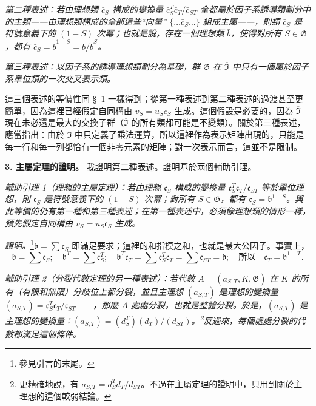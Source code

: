 \documentclass[11pt]{article}
\begin{document}
\emph{第二種表述：若由理想類 \(\bar c_S\) 構成的變換量 \(\bar c_S^T\bar c_T/\bar c_{ST}\) 全都屬於因子系誘導類劃分中的主類——由理想類構成的全部這些“向量” \(\{\ldots\bar c_S\ldots\}\) 組成主屬——，則類 \(\bar c_S\) 是符號意義下的 \((1-S)\) 次冪；也就是說，存在一個理想類 \(\bar b\)，使得對所有 \(S\in\mathfrak G\)，都有 \(\bar c_S=\bar b^{1-S}=\bar b/\bar b^S\)。}

\emph{第三種表述：以因子系的誘導理想類劃分為基礎，群 \(\mathfrak G\) 在 \(\overline{\mathfrak I}\) 中只有一個屬於因子系單位類的一次交叉表示類。}

這三個表述的等價性同 §~1 一樣得到；從第一種表述到第二種表述的過渡甚至更簡單，因為這裡已經假定自同構由 \(v_S=u_S\bar c_S\) 生成。這個假設是必要的，因為 \(\overline{\mathfrak I}\) 現在未必還是最大的交換子群（\(\overline{\mathfrak I}\) 的所有類都可能是不變類）。關於第三種表述，應當指出：由於 \(\overline{\mathfrak I}\) 中只定義了乘法運算，所以這裡作為表示矩陣出現的，只能是每一行和每一列都恰有一個非零元素的矩陣；對一次表示而言，這並不是限制。

\noindent\textbf{3. 主屬定理的證明。} 我證明第二種表述。證明基於兩個輔助引理。

\emph{輔助引理 1（理想的主屬定理）：若由理想 \(\mathfrak c_S\) 構成的變換量 \(\mathfrak c_S^T\mathfrak c_T/\mathfrak c_{ST}\) 等於單位理想，則 \(\mathfrak c_S\) 是符號意義下的 \((1-S)\) 次冪；對所有 \(S\in\mathfrak G\)，都有 \(\mathfrak c_S=\mathfrak b^{1-S}\)。與此等價的仍有第一種和第三種表述；在第一種表述中，必須像理想類的情形一樣，預先假定自同構由 \(v_S=u_S\mathfrak c_S\) 生成。}

\emph{證明。}\footnote{參見引言的末尾。}\(\mathfrak b=\sum\mathfrak c_S\) 即滿足要求；這裡的和指模之和，也就是最大公因子。事實上，
\[
\mathfrak b=\sum\mathfrak c_S;\quad
\mathfrak b^T=\sum\mathfrak c_S^T;\quad
\mathfrak b^T\mathfrak c_T=\sum\mathfrak c_S^T\mathfrak c_T
=\sum\mathfrak c_{ST}=\mathfrak b;\quad
\text{所以}\quad\mathfrak c_T=\mathfrak b^{1-T}.
\]

\emph{輔助引理 2（分裂代數定理的另一種表述）：若代數 \(A=(a_{S,T},K,\mathfrak G)\) 在 \(K\) 的所有（有限和無限）分歧位上都分裂，並且主理想 \((a_{S,T})\) 是理想的變換量——\((a_{S,T})=\mathfrak c_S^T\mathfrak c_T/\mathfrak c_{ST}\)——，那麼 \(A\) 處處分裂，也就是整體分裂。於是，\((a_{S,T})\) 是主理想的變換量：\((a_{S,T})=(d_S^T)(d_T)/(d_{ST})\)。\footnote{更精確地說，有 \(a_{S,T}=d_S^Td_T/d_{ST}\)。不過在主屬定理的證明中，只用到關於主理想的這個較弱結論。}反過來，每個處處分裂的代數都滿足這個條件。}
\end{document}
